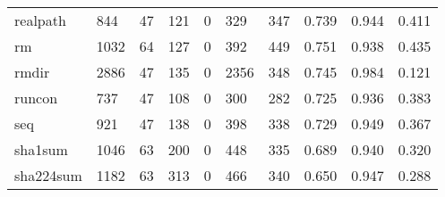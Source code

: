 \begin{longtable}{lp{1.3cm}p{1.3cm}p{1.3cm}p{1.3cm}p{1.3cm}p{1.3cm}p{1.3cm}p{1.3cm}p{1.3cm}}
realpath  &                    844 &                                 47 &                               121 &                                0 &                               329 &                             347 &                                0.739 &                                  0.944 &                                0.411 \\
rm        &                   1032 &                                 64 &                               127 &                                0 &                               392 &                             449 &                                0.751 &                                  0.938 &                                0.435 \\
rmdir     &                   2886 &                                 47 &                               135 &                                0 &                              2356 &                             348 &                                0.745 &                                  0.984 &                                0.121 \\
runcon    &                    737 &                                 47 &                               108 &                                0 &                               300 &                             282 &                                0.725 &                                  0.936 &                                0.383 \\
seq       &                    921 &                                 47 &                               138 &                                0 &                               398 &                             338 &                                0.729 &                                  0.949 &                                0.367 \\
sha1sum   &                   1046 &                                 63 &                               200 &                                0 &                               448 &                             335 &                                0.689 &                                  0.940 &                                0.320 \\
sha224sum &                   1182 &                                 63 &                               313 &                                0 &                               466 &                             340 &                                0.650 &                                  0.947 &                                0.288 \\

\end{longtable}
